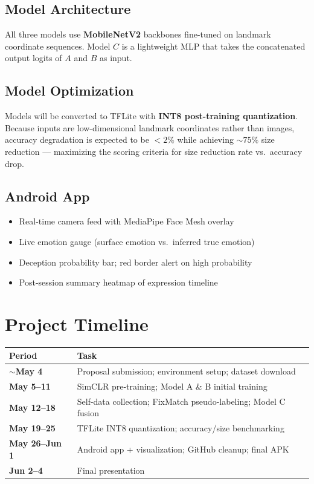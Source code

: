 \documentclass[10pt]{article}
\begin{document}
\subsection{Model Architecture}

All three models use \textbf{MobileNetV2} backbones fine-tuned on landmark coordinate
sequences. Model $C$ is a lightweight MLP that takes the concatenated output logits
of $A$ and $B$ as input.

\subsection{Model Optimization}

Models will be converted to TFLite with \textbf{INT8 post-training quantization}.
Because inputs are low-dimensional landmark coordinates rather than images,
accuracy degradation is expected to be $<2\%$ while achieving $\sim75\%$
size reduction --- maximizing the scoring criteria for size reduction rate vs.\
accuracy drop.

\subsection{Android App}

\begin{itemize}[leftmargin=*, topsep=2pt, itemsep=1pt]
  \item Real-time camera feed with MediaPipe Face Mesh overlay
  \item Live emotion gauge (surface emotion vs.\ inferred true emotion)
  \item Deception probability bar; red border alert on high probability
  \item Post-session summary heatmap of expression timeline
\end{itemize}

\section{Project Timeline}

\begin{center}
\small
\begin{tabular}{>{\bfseries}p{2.0cm} p{4.8cm}}
\toprule
Period & Task \\
\midrule
$\sim$May 4   & Proposal submission; environment setup; dataset download \\
May 5--11      & SimCLR pre-training; Model A \& B initial training \\
May 12--18     & Self-data collection; FixMatch pseudo-labeling; Model C fusion \\
May 19--25     & TFLite INT8 quantization; accuracy/size benchmarking \\
May 26--Jun 1  & Android app + visualization; GitHub cleanup; final APK \\
Jun 2--4       & Final presentation \\
\bottomrule
\end{tabular}
\end{center}
\end{document}
